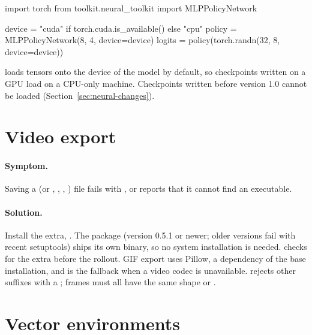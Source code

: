 \begin{pycode}
import torch
from toolkit.neural_toolkit import MLPPolicyNetwork

device = "cuda" if torch.cuda.is_available() else "cpu"
policy = MLPPolicyNetwork(8, 4, device=device)
logits = policy(torch.randn(32, 8, device=device))
\end{pycode}

 loads tensors onto the device of the
model by default, so checkpoints written on a GPU load on a CPU-only machine.
Checkpoints written before version 1.0 cannot be loaded
(Section~\ref{sec:neural-changes}).

\section{Video export}\label{sec:trouble-video}

\paragraph{Symptom.} Saving a  (or , ,
, ) file fails with , or  reports that it cannot find an
 executable.

\paragraph{Solution.} Install the  extra,
. The  package (version
0.5.1 or newer; older versions fail with recent setuptools) ships its own
 binary, so no system installation is needed.
 checks for the extra before the rollout.
GIF export uses Pillow, a dependency of the base installation, and is the
fallback when a video codec is unavailable.  rejects other suffixes with
a ; frames must all have the same shape
 or .

\section{Vector environments}\label{sec:trouble-vector}


